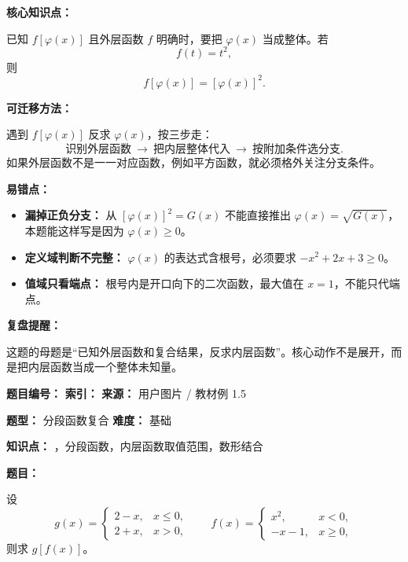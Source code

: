 \begin{knowledgeBox}
\textbf{核心知识点：}

已知 \(f[\varphi(x)]\) 且外层函数 \(f\) 明确时，要把 \(\varphi(x)\) 当成整体。若
\[
f(t)=t^2,
\]
则
\[
f[\varphi(x)]=[\varphi(x)]^2.
\]

\textbf{可迁移方法：}

遇到 \(f[\varphi(x)]\) 反求 \(\varphi(x)\)，按三步走：
\[
\text{识别外层函数}\ \longrightarrow\ \text{把内层整体代入}\ \longrightarrow\ \text{按附加条件选分支}.
\]
如果外层函数不是一一对应函数，例如平方函数，就必须格外关注分支条件。
\end{knowledgeBox}

\begin{mistakeBox}
\textbf{易错点：}

\begin{itemize}
  \item \textbf{漏掉正负分支：} 从 \([\varphi(x)]^2=G(x)\) 不能直接推出 \(\varphi(x)=\sqrt{G(x)}\)，本题能这样写是因为 \(\varphi(x)\ge 0\)。
  \item \textbf{定义域判断不完整：} \(\varphi(x)\) 的表达式含根号，必须要求 \(-x^2+2x+3\ge 0\)。
  \item \textbf{值域只看端点：} 根号内是开口向下的二次函数，最大值在 \(x=1\)，不能只代端点。
\end{itemize}

\textbf{复盘提醒：}

这题的母题是“已知外层函数和复合结果，反求内层函数”。核心动作不是展开，而是把内层函数当成一个整体未知量。
\end{mistakeBox}

\begin{problemBox}
\begin{problemMeta}
\textbf{题目编号：}  \quad
\textbf{索引：}  \quad
\textbf{来源：} 用户图片 / 教材例 1.5

\textbf{题型：} 分段函数复合 \quad
\textbf{难度：} 基础

\textbf{知识点：} ，分段函数，内层函数取值范围，数形结合
\end{problemMeta}

\textbf{题目：}

设
\[
g(x)=
\begin{cases}
2-x, & x\le 0,\\
2+x, & x>0,
\end{cases}
\qquad
f(x)=
\begin{cases}
x^2, & x<0,\\
-x-1, & x\ge 0,
\end{cases}
\]
则求 \(g[f(x)]\)。
\end{problemBox}

